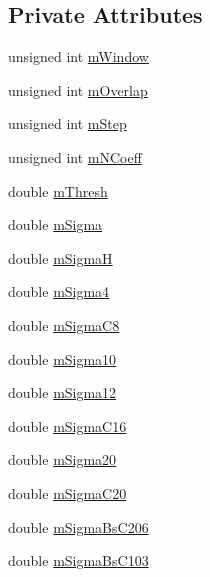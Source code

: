 \subsection*{Private Attributes}
\begin{DoxyCompactItemize}
\item 
unsigned int \hyperlink{classtsa_1_1_w_d_f2_classify_ad43aff1c0e620adc555fe8330dc2fc87}{m\+Window}
\item 
unsigned int \hyperlink{classtsa_1_1_w_d_f2_classify_a0fe8b454c89c103dbcc43b97c028a6e6}{m\+Overlap}
\item 
unsigned int \hyperlink{classtsa_1_1_w_d_f2_classify_ae3c2eb273280319045076acf41ace9ff}{m\+Step}
\item 
unsigned int \hyperlink{classtsa_1_1_w_d_f2_classify_aaadd89368b07c41bfe272600eacabf0d}{m\+N\+Coeff}
\item 
double \hyperlink{classtsa_1_1_w_d_f2_classify_a8d229f13b7b5fec695785f644eafffb8}{m\+Thresh}
\item 
double \hyperlink{classtsa_1_1_w_d_f2_classify_a0f73327c9983554d190029fa532d20dd}{m\+Sigma}
\item 
double \hyperlink{classtsa_1_1_w_d_f2_classify_a0fd805367fac9aac89e1cc6d7157921f}{m\+SigmaH}
\item 
double \hyperlink{classtsa_1_1_w_d_f2_classify_a78835e7f67c9dd1179ce65f0a287f8c3}{m\+Sigma4}
\item 
double \hyperlink{classtsa_1_1_w_d_f2_classify_a35b02c94d5db7b334d12449699bbe08c}{m\+Sigma\+C8}
\item 
double \hyperlink{classtsa_1_1_w_d_f2_classify_a1a127de2a534323cf00e5dcd981094c6}{m\+Sigma10}
\item 
double \hyperlink{classtsa_1_1_w_d_f2_classify_ae883c682179f3dcbd09627cf70eb7b13}{m\+Sigma12}
\item 
double \hyperlink{classtsa_1_1_w_d_f2_classify_a4048cccdaaebf02c10d35cb3e9a4171e}{m\+Sigma\+C16}
\item 
double \hyperlink{classtsa_1_1_w_d_f2_classify_a55e158a86a9860d186ed02a3785ecfe1}{m\+Sigma20}
\item 
double \hyperlink{classtsa_1_1_w_d_f2_classify_a9a03a8cb74146c9bdc2fa83d14f2ed9e}{m\+Sigma\+C20}
\item 
double \hyperlink{classtsa_1_1_w_d_f2_classify_a0d00e5f6ad0ad0a5c705501ef4a9d143}{m\+Sigma\+Bs\+C206}
\item 
double \hyperlink{classtsa_1_1_w_d_f2_classify_a5ebaed77b5148f9a34c269bc92c676d4}{m\+Sigma\+Bs\+C103}
\item 

\end{DoxyCompactItemize}
